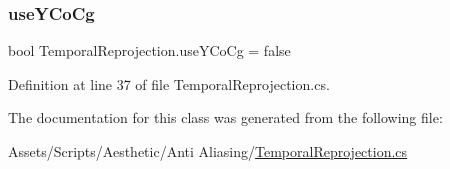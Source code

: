 \subsubsection{\texorpdfstring{use\+Y\+Co\+Cg}{useYCoCg}}
{\footnotesize\ttfamily bool Temporal\+Reprojection.\+use\+Y\+Co\+Cg = false}



Definition at line 37 of file Temporal\+Reprojection.\+cs.



The documentation for this class was generated from the following file\+:\begin{DoxyCompactItemize}
\item 
Assets/\+Scripts/\+Aesthetic/\+Anti Aliasing/\mbox{\hyperlink{_temporal_reprojection_8cs}{Temporal\+Reprojection.\+cs}}\end{DoxyCompactItemize}
